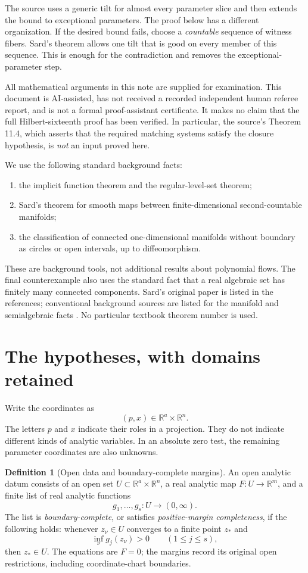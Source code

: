 \documentclass[11pt]{article}
\theoremstyle{definition}
\newtheorem{definition}[theorem]{Definition}
\theoremstyle{remark}
\newcommand{\R}{\mathbb R}
\begin{document}
The source uses a generic tilt for almost every parameter slice and then
extends the bound to exceptional parameters. The proof below has a
different organization. If the desired bound fails, choose a
\emph{countable} sequence of witness fibers. Sard's theorem allows one
tilt that is good on every member of this sequence. This is enough for
the contradiction and removes the exceptional-parameter step.

All mathematical arguments in this note are supplied for examination.
This document is AI-assisted, has not received a recorded independent
human referee report, and is not a formal proof-assistant certificate.
It makes no claim that the full Hilbert-sixteenth proof has been
verified. In particular, the source's Theorem 11.4, which asserts that
the required matching systems satisfy the closure hypothesis, is
\emph{not} an input proved here.

We use the following standard background facts:
\begin{enumerate}[label=(\roman*),leftmargin=*]
\item the implicit function theorem and the regular-level-set theorem;
\item Sard's theorem for smooth maps between finite-dimensional
second-countable manifolds;
\item the classification of connected one-dimensional manifolds without
boundary as circles or open intervals, up to diffeomorphism.
\end{enumerate}
These are background tools, not additional results about polynomial
flows. The final counterexample also uses the standard fact that a real
algebraic set has finitely many connected components. Sard's original
paper is listed in the references; conventional background sources
are listed for the manifold and semialgebraic facts
\cite{Sard,Lee,BCR}. No particular textbook theorem number is used.

\section{The hypotheses, with domains retained}
\label{sec:hypotheses}

Write the coordinates as
\[
 (p,x)\in\R^a\times\R^n.
\]
The letters \(p\) and \(x\) indicate their roles in a projection. They
do not indicate different kinds of analytic variables. In an absolute
zero test, the remaining parameter coordinates are also unknowns.

\begin{definition}[Open data and boundary-complete margins]
\label{def:data}
An open analytic datum consists of an open set
\(U\subset\R^a\times\R^n\), a real analytic map
\(F:U\to\R^m\), and a finite list of real analytic functions
\[
 g_1,\ldots,g_s:U\longrightarrow(0,\infty).
\]
The list is \emph{boundary-complete}, or satisfies
\emph{positive-margin completeness}, if the following holds:
whenever \(z_\nu\in U\) converges to a finite point \(z_*\) and
\[
 \inf_\nu g_j(z_\nu)>0\qquad(1\le j\le s),
\]
then \(z_*\in U\).
The equations are \(F=0\); the margins record its original open
restrictions, including coordinate-chart boundaries.
\end{definition}
\end{document}
